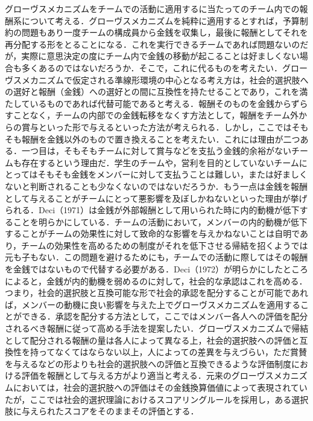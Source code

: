 \documentclass[a4paper, 11pt]{jsarticle}
\begin{document}
グローヴスメカニズムをチームでの活動に適用するに当たってのチーム内での報酬系について考える．グローヴスメカニズムを純粋に適用するとすれば，予算制約の問題もあり一度チームの構成員から金銭を収集し，最後に報酬としてそれを再分配する形をとることになる．これを実行できるチームであれば問題ないのだが，実際に意思決定の度にチーム内で金銭の移動が起こることは好ましくない場合も多くあるのではないだろうか．そこで，これに代るものを考えたい．グローヴスメカニズムで仮定される準線形環境の中心となる考え方は，社会的選択肢への選好と報酬（金銭）への選好との間に互換性を持たせることであり，これを満たしているものであれば代替可能であると考える．報酬そのものを金銭からずらすことなく，チームの内部での金銭転移をなくす方法として，報酬をチーム外からの賞与といった形で与えるといった方法が考えられる．しかし，ここではそもそも報酬を金銭以外のもので置き換えることを考えたい．これには理由が二つある．一つ目は，そもそもチームに対して賞与などを支払う金銭的余裕がないチームも存在するという理由だ．学生のチームや，営利を目的としていないチームにとってはそもそも金銭をメンバーに対して支払うことは難しい，または好ましくないと判断されることも少なくないのではないだろうか．もう一点は金銭を報酬として与えることがチームにとって悪影響を及ぼしかねないといった理由が挙げられる．Deci（1971）\cite{Deci-1971}は金銭が外部報酬として用いられた時に内的動機が低下することを明らかにしている．チームの活動において，メンバーの内的動機が低下することがチームの効果性に対して致命的な影響を与えかねないことは自明であり，チームの効果性を高めるための制度がそれを低下させる帰結を招くようでは元も子もない．この問題を避けるためにも，チームでの活動に際してはその報酬を金銭ではないもので代替する必要がある．Deci（1972）\cite{Deci-1972}が明らかにしたところによると，金銭が内的動機を弱めるのに対して，社会的な承認はこれを高める．つまり，社会的選択肢と互換可能な形で社会的承認を配分することが可能であれば，メンバーの動機に良い影響を与えた上でグローヴスメカニズムを適用することができる．承認を配分する方法として，ここではメンバー各人への評価を配分されるべき報酬に従って高める手法を提案したい．グローヴスメカニズムで帰結として配分される報酬の量は各人によって異なる上，社会的選択肢への評価と互換性を持ってなくてはならない以上，人によっての差異を与えづらい，ただ賞賛を与えるなどの形よりも社会的選択肢への評価と互換できるような評価制度における評価を報酬として与える方がより適当と考える．元来のグローヴスメカニズムにおいては，社会的選択肢への評価はその金銭換算価値によって表現されていたが，ここでは社会的選択理論におけるスコアリングルールを採用し，ある選択肢に与えられたスコアをそのままその評価とする．
\end{document}
